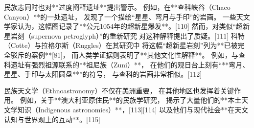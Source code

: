 民族志同时也对**过度阐释遗址**提出警示。
例如，在**查科峡谷（Chaco Canyon）**的一处遗址，
发现了一个描绘“星星、弯月与手印”的岩画。
一些天文学家认为，这幅图记录了**公元1054年的超新星爆发**。[110]
然而，对类似“超新星岩刻（supernova petroglyph）”的重新研究
对这种解释提出了质疑。[111]
科特（Cotte）与拉格尔斯（Ruggles）在其研究中
将这幅“超新星岩刻”列为**已被完全驳斥的案例**[81]，
而人类学证据则表明了**其他文化性解释**。
例如，与查科遗址有强烈祖源联系的**祖尼族（Zuni）**，
在他们的观日台上刻有“**弯月、星星、手印与太阳圆盘**”的符号，
与查科的岩画非常相似。[112]

民族天文学（Ethnoastronomy）不仅在美洲重要，
在其他地区也发挥着关键作用。
例如，关于**澳大利亚原住民**的民族学研究，
揭示了大量他们的**本土天文学知识（Indigenous astronomies）**，[113][114]
以及他们与现代社会**在天文认知与世界观上的互动**。[115]
